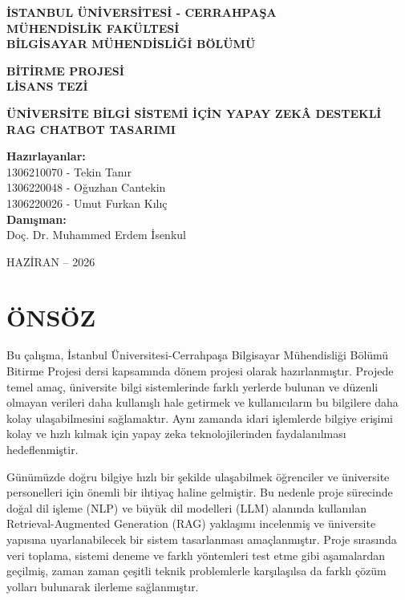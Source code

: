 \documentclass[12pt,a4paper]{report}
\newcommand{\university}{İSTANBUL ÜNİVERSİTESİ - CERRAHPAŞA}
\newcommand{\faculty}{MÜHENDİSLİK FAKÜLTESİ}
\newcommand{\department}{BİLGİSAYAR MÜHENDİSLİĞİ BÖLÜMÜ}
\newcommand{\course}{BİTİRME PROJESİ \\ LİSANS TEZİ}
\newcommand{\projecttitle}{ÜNİVERSİTE BİLGİ SİSTEMİ İÇİN YAPAY ZEKÂ DESTEKLİ RAG CHATBOT TASARIMI}
\newcommand{\advisor}{Doç. Dr. Muhammed Erdem İsenkul}
\newcommand{\dateinfo}{HAZİRAN -- 2026}
\begin{document}
\begin{titlepage}
  \centering

  {\bfseries\large \university \\[0.5cm]}
  {\bfseries\large \faculty \\[0.5cm]}
  {\bfseries\large \department \\[2cm]}

  {\bfseries\large \course \\[2cm]}

  {\bfseries\Large \projecttitle \\[2.5cm]}

  \textbf{Hazırlayanlar:}\\[0.2cm]
  1306210070 - Tekin Tanır \\[0.3cm]
  1306220048 - Oğuzhan Cantekin \\[0.3cm]
  1306220026 - Umut Furkan Kılıç \\[0.3cm]

  \vspace{1cm}
  \textbf{Danışman:}\\[0.2cm]
  \advisor

  \vfill
  {\dateinfo}
\end{titlepage}


\chapter*{ÖNSÖZ}

Bu çalışma, İstanbul Üniversitesi-Cerrahpaşa Bilgisayar Mühendisliği Bölümü Bitirme Projesi dersi kapsamında dönem projesi olarak hazırlanmıştır. Projede temel amaç, üniversite bilgi sistemlerinde farklı yerlerde bulunan ve düzenli olmayan verileri daha kullanışlı hale getirmek ve kullanıcıların bu bilgilere daha kolay ulaşabilmesini sağlamaktır. Aynı zamanda idari işlemlerde bilgiye erişimi kolay ve hızlı kılmak için yapay zeka teknolojilerinden faydalanılması hedeflenmiştir.

Günümüzde doğru bilgiye hızlı bir şekilde ulaşabilmek öğrenciler ve üniversite personelleri için önemli bir ihtiyaç haline gelmiştir. Bu nedenle proje sürecinde doğal dil işleme (NLP) ve büyük dil modelleri (LLM) alanında kullanılan Retrieval-Augmented Generation (RAG) yaklaşımı incelenmiş ve üniversite yapısına uyarlanabilecek bir sistem tasarlanması amaçlanmıştır. Proje sırasında veri toplama, sistemi deneme ve farklı yöntemleri test etme gibi aşamalardan geçilmiş, zaman zaman çeşitli teknik problemlerle karşılaşılsa da farklı çözüm yolları bulunarak ilerleme sağlanmıştır.
\end{document}
